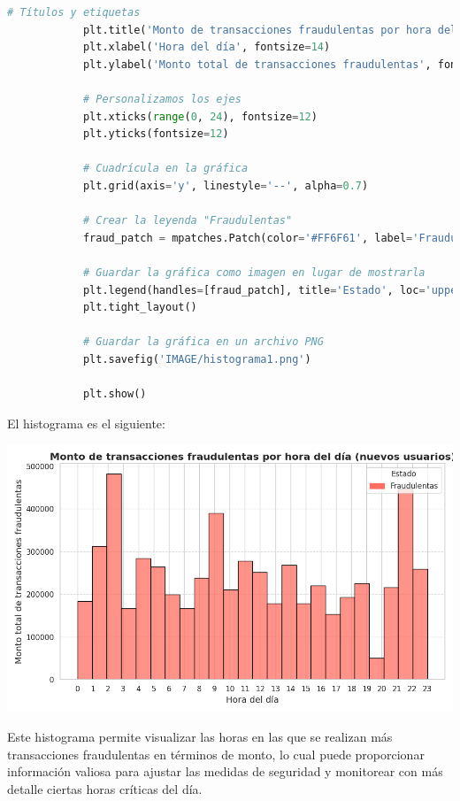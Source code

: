 \documentclass{article}
\begin{document}
\begin{itemize}
\begin{lstlisting}[language=Python, caption=Implementación del Histograma del monto de transacciones por hora del día]
            # Títulos y etiquetas
            plt.title('Monto de transacciones fraudulentas por hora del día (nuevos usuarios)', fontsize=16, fontweight='bold')
            plt.xlabel('Hora del día', fontsize=14)
            plt.ylabel('Monto total de transacciones fraudulentas', fontsize=14)
            
            # Personalizamos los ejes
            plt.xticks(range(0, 24), fontsize=12)
            plt.yticks(fontsize=12)
            
            # Cuadrícula en la gráfica
            plt.grid(axis='y', linestyle='--', alpha=0.7)
            
            # Crear la leyenda "Fraudulentas"
            fraud_patch = mpatches.Patch(color='#FF6F61', label='Fraudulentas')
            
            # Guardar la gráfica como imagen en lugar de mostrarla
            plt.legend(handles=[fraud_patch], title='Estado', loc='upper right', fontsize=12)
            plt.tight_layout()
            
            # Guardar la gráfica en un archivo PNG
            plt.savefig('IMAGE/histograma1.png')
            
            plt.show()
        \end{lstlisting}

        El histograma es el siguiente:

        \begin{center}
            \includegraphics[scale=0.5]{IMAGE/histograma1.png}
        \end{center}

        Este histograma permite visualizar las horas en las que se realizan más transacciones fraudulentas en términos de monto, lo cual puede proporcionar información valiosa para ajustar las medidas de seguridad y monitorear con más detalle ciertas horas críticas del día.


\end{itemize}
\end{document}
